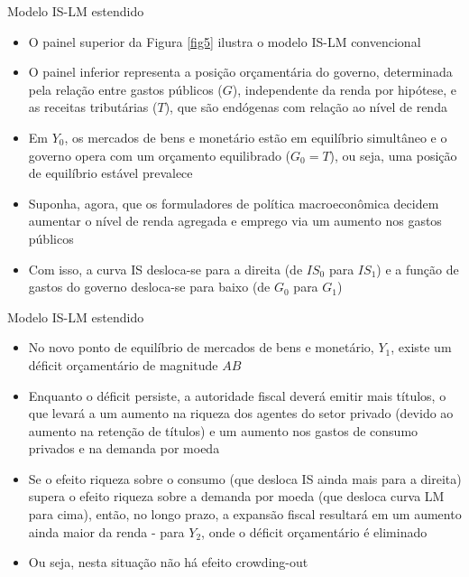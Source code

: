 \documentclass[10pt]{beamer}
\begin{document}
\begin{frame}{Modelo IS-LM estendido}
    \begin{itemize}
        \item O painel superior da Figura \ref{fig5} ilustra o modelo IS-LM convencional
        \bigskip
        \item O painel inferior representa a posição orçamentária do governo, determinada pela relação entre gastos públicos ($G$), independente da renda por hipótese, e as receitas tributárias ($T$), que são endógenas com relação ao nível de renda
        \bigskip
        \item Em $Y_0$, os mercados de bens e monetário estão em equilíbrio simultâneo e o governo opera com um orçamento equilibrado ($G_0 = T$), ou seja, uma posição de equilíbrio estável prevalece
        \bigskip
        \item Suponha, agora, que os formuladores de política macroeconômica decidem aumentar o nível de renda agregada e emprego via um aumento nos gastos públicos
        \bigskip
        \item Com isso, a curva IS desloca-se para a direita (de $IS_0$ para $IS_1$) e a função de gastos do governo desloca-se para baixo (de $G_0$ para $G_1$)
    \end{itemize}
\end{frame}

\begin{frame}{Modelo IS-LM estendido}
    \begin{itemize}
        \item No novo ponto de equilíbrio de mercados de bens e monetário, $Y_1$, existe um déficit orçamentário de magnitude $AB$
        \bigskip
        \item Enquanto o déficit persiste, a autoridade fiscal deverá emitir mais títulos, o que levará a um aumento na riqueza dos agentes do setor privado (devido ao aumento na retenção de títulos) e um aumento nos gastos de consumo privados e na demanda por moeda
        \bigskip
        \item Se o efeito riqueza sobre o consumo (que desloca IS ainda mais para a direita) supera o efeito riqueza sobre a demanda por moeda (que desloca curva LM para cima), então, no longo prazo, a expansão fiscal resultará em um aumento ainda maior da renda - para $Y_2$, onde o déficit orçamentário é eliminado
        \bigskip
        \item Ou seja, nesta situação não há efeito crowding-out
    \end{itemize}
\end{frame}
\end{document}
